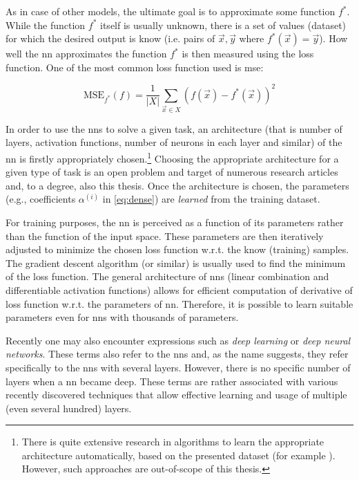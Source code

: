 As in case of other  models, the ultimate goal is to approximate some function $f^*$. While the function $f^*$ itself is usually unknown, there is a set of values (dataset) for which the desired output is know (i.e. pairs of $\vec{x}, \vec{y}$ where $f^*(\vec{x}) = \vec{y}$). How well the \gls{nn} approximates the function $f^*$ is then measured using the loss function. One of the most common loss function used is \gls{mse}:

$$\text{MSE}_{f^*}(f) = \frac{1}{|X|} \sum_{\vec{x} \in X} (f(\vec{x}) - f^*(\vec{x}))^2$$

In order to use the \glspl{nn} to solve a given task, an architecture (that is number of layers, activation functions, number of neurons in each layer and similar) of the \gls{nn} is firstly appropriately chosen.\footnote{There is quite extensive research in algorithms to learn the appropriate architecture automatically, based on the presented dataset (for example \cite{neat}). However, such approaches are out-of-scope of this thesis.} Choosing the appropriate architecture for a given type of task is an open problem and target of numerous research articles and, to a degree, also this thesis. Once the architecture is chosen, the parameters (e.g., coefficients $\alpha^{(i)}$ in \autoref{eq:dense}) are \emph{learned} from the training dataset.

For training purposes, the \gls{nn} is perceived as a function of its parameters rather than the function of the input space. These parameters are then iteratively adjusted to minimize the chosen loss function w.r.t. the know (training) samples. The gradient descent algorithm (or similar) is usually used to find the minimum of the loss function. The general architecture of \glspl{nn} (linear combination and differentiable activation functions) allows for efficient computation of derivative of loss function w.r.t. the parameters of \gls{nn}. Therefore, it is possible to learn suitable parameters even for \glspl{nn} with thousands of parameters.

Recently one may also encounter expressions such as \emph{deep learning} or \emph{deep neural networks}. These terms also refer to the \glspl{nn} and, as the name suggests, they refer specifically to the \glspl{nn} with several layers. However, there is no specific number of layers when a \gls{nn} became deep. These terms are rather associated with various recently discovered techniques that allow effective learning and usage of multiple (even several hundred) layers.

